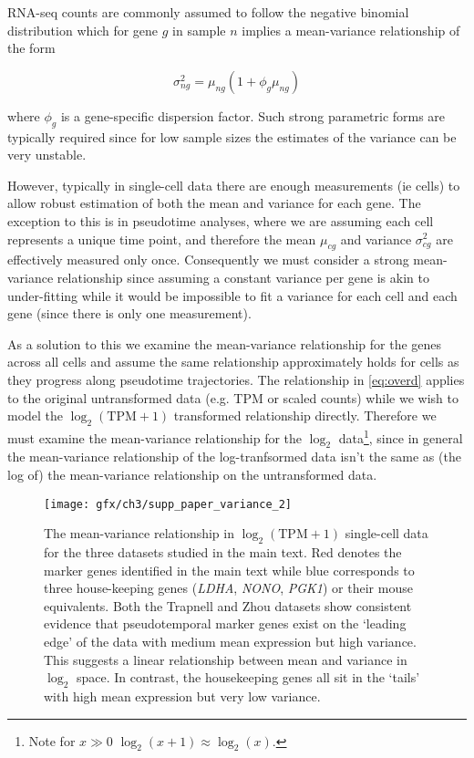 RNA-seq counts are commonly assumed to follow the negative binomial distribution 
\cite{Anders2010,Love2014-lx,Robinson2010-rj}
which for gene $g$ in sample $n$ implies a mean-variance relationship of the form

\begin{equation} \label{eq:overd}
\sigma_{ng}^2 = \mu_{ng}(1 + \phi_g \mu_{ng})
\end{equation}

where $\phi_g$ is a gene-specific dispersion factor. Such strong parametric forms are typically required since for low sample sizes the estimates of the variance can be very unstable. %

However, typically in single-cell data there are enough measurements (ie cells) to allow robust estimation of both the mean and variance for each gene\cite{Finak2015-iy}. The exception to this is in pseudotime analyses, where we are assuming each cell represents a unique time point, and therefore the mean $\mu_{cg}$ and variance $\sigma^2_{cg}$ are effectively measured only once. Consequently we must consider a strong mean-variance relationship since assuming a constant variance per gene is akin to under-fitting while it would be impossible to fit a variance for each cell and each gene (since there is only one measurement).

As a solution to this we examine the mean-variance relationship for the genes across all cells and assume the same relationship approximately holds for cells as they progress along pseudotime trajectories. The relationship in \ref{eq:overd} applies to the original untransformed data (e.g. TPM or scaled counts) while we wish to model the $\log_2(\text{TPM} + 1)$ transformed relationship directly. Therefore we must examine the mean-variance relationship for the $\log_2$ data\footnote{Note for $x \gg 0$ $\log_2(x+1) \approx \log_2(x)$.}, since in general the mean-variance relationship of the log-tranfsormed data isn't the same as (the log of) the mean-variance relationship on the untransformed data.

\begin{figure}
\centering
 \texttt{[image: gfx/ch3/supp\_paper\_variance\_2]}
 \caption{The mean-variance relationship in $\log_2(\text{TPM} + 1)$ single-cell data for the three datasets studied in the main text. Red denotes the marker genes identified in the main text while blue corresponds to three house-keeping genes (\emph{LDHA}, \emph{NONO}, \emph{PGK1}) or their mouse equivalents. Both the Trapnell and Zhou datasets show consistent evidence that pseudotemporal marker genes exist on the `leading edge' of the data with medium mean expression but high variance. This suggests a linear relationship between mean and variance in $\log_2$ space. In contrast, the housekeeping genes all sit in the `tails' with high mean expression but very low variance.} \label{fig:variance}
 \end{figure}

